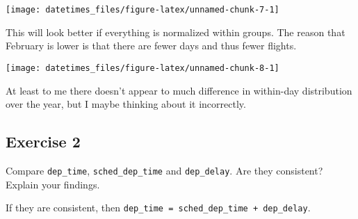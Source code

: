 \documentclass[]{book}
\newenvironment{Shaded}{\begin{snugshade}}{\end{snugshade}}
\newcommand{\DataTypeTok}[1]{\textcolor[rgb]{0.13,0.29,0.53}{#1}}
\newcommand{\DecValTok}[1]{\textcolor[rgb]{0.00,0.00,0.81}{#1}}
\newcommand{\KeywordTok}[1]{\textcolor[rgb]{0.13,0.29,0.53}{\textbf{#1}}}
\newcommand{\NormalTok}[1]{#1}
\newcommand{\OperatorTok}[1]{\textcolor[rgb]{0.81,0.36,0.00}{\textbf{#1}}}
\newcommand{\StringTok}[1]{\textcolor[rgb]{0.31,0.60,0.02}{#1}}
\theoremstyle{plain}
\theoremstyle{remark}
\theoremstyle{definition}
\theoremstyle{definition}
\theoremstyle{definition}
\theoremstyle{remark}
\begin{document}
\begin{center}\texttt{[image: datetimes\_files/figure-latex/unnamed-chunk-7-1]} \end{center}

This will look better if everything is normalized within groups. The
reason that February is lower is that there are fewer days and thus
fewer flights.

\begin{Shaded}
\end{Shaded}

\begin{center}\texttt{[image: datetimes\_files/figure-latex/unnamed-chunk-8-1]} \end{center}

At least to me there doesn't appear to much difference in within-day
distribution over the year, but I maybe thinking about it incorrectly.

\hypertarget{exercise-2-45}{%
\subsection{Exercise 2}\label{exercise-2-45}}

Compare \texttt{dep\_time}, \texttt{sched\_dep\_time} and
\texttt{dep\_delay}. Are they consistent? Explain your findings.

If they are consistent, then
\texttt{dep\_time\ =\ sched\_dep\_time\ +\ dep\_delay}.
\end{document}
